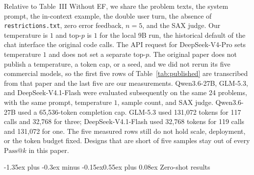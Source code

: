\documentclass[11pt]{article}
\makeatletter
\renewcommand\section{\@startsection{section}{1}{\z@}%
  {-1.35ex plus -0.3ex minus -0.15ex}{0.55ex plus 0.08ex}%
  {\normalfont\large\bfseries}}
\newcommand{\passk}[1]{\mathrm{Pass@}#1}
\makeatother
\begin{document}
Relative to Table~III Without EF, we share the problem texts, the system prompt, the in-context example, the double user turn, the absence of \texttt{restrictions.txt}, zero error feedback, $n=5$, and the SAX judge.
Our temperature is $1$ and top-$p$ is $1$ for the local 9B run, the historical default of the chat interface the original code calls. The API request for DeepSeek-V4-Pro sets temperature $1$ and does not set a separate top-$p$.
The original paper does not publish a temperature, a token cap, or a seed, and we did not rerun its five commercial models, so the first five rows of Table~\ref{tab:published} are transcribed from that paper and the last five are our measurements.
Qwen3.6-27B, GLM-5.3, and DeepSeek-V4.1-Flash were evaluated subsequently on the same 24 problems, with the same prompt, temperature $1$, sample count, and SAX judge. Qwen3.6-27B used a 65{,}536-token completion cap. GLM-5.3 used 131{,}072 tokens for 117 calls and 32{,}768 for three; DeepSeek-V4.1-Flash used 32{,}768 tokens for 119 calls and 131{,}072 for one.
The five measured rows still do not hold scale, deployment, or the token budget fixed.
Designs that are short of five samples stay out of every $\passk{k}$ in this paper.

\section{Zero-shot results}
\label{sec:results}
\end{document}
